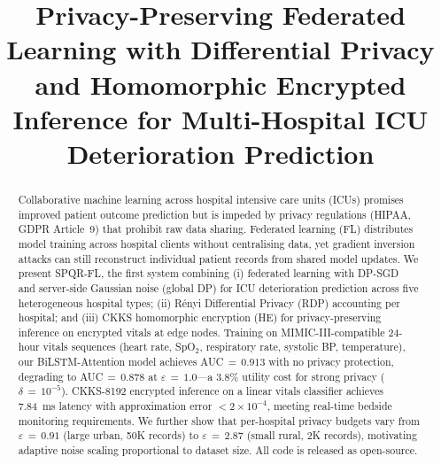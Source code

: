 \documentclass[10pt,journal,compsoc]{IEEEtran}
\begin{document}
\title{Privacy-Preserving Federated Learning with Differential Privacy
       and Homomorphic Encrypted Inference for Multi-Hospital
       ICU Deterioration Prediction}

\author{
}


\maketitle

\begin{abstract}
Collaborative machine learning across hospital intensive care units
(ICUs) promises improved patient outcome prediction but is impeded by
privacy regulations (HIPAA, GDPR Article~9) that prohibit raw data
sharing.
Federated learning (FL) distributes model training across hospital
clients without centralising data, yet gradient inversion attacks
can still reconstruct individual patient records from shared model
updates.
We present SPQR-FL, the first system combining
(i) federated learning with DP-SGD~\cite{abadi2016} and
server-side Gaussian noise (global DP) for ICU deterioration
prediction across five heterogeneous hospital types;
(ii) Rényi Differential Privacy (RDP) accounting per hospital;
and (iii) CKKS homomorphic encryption (HE) for privacy-preserving
inference on encrypted vitals at edge nodes.
Training on MIMIC-III-compatible 24-hour vitals sequences
(heart rate, SpO$_2$, respiratory rate, systolic BP, temperature),
our BiLSTM-Attention model achieves AUC$\,{=}\,0.913$ with no
privacy protection, degrading to AUC$\,{=}\,0.878$ at
$\varepsilon\,{=}\,1.0$---a 3.8\% utility cost for strong privacy
($\delta\,{=}\,10^{-5}$).
CKKS-8192 encrypted inference on a linear vitals classifier achieves
7.84~ms latency with approximation error $<\!2\!\times\!10^{-4}$,
meeting real-time bedside monitoring requirements.
We further show that per-hospital privacy budgets vary from
$\varepsilon\,{=}\,0.91$ (large urban, 50K records) to
$\varepsilon\,{=}\,2.87$ (small rural, 2K records),
motivating adaptive noise scaling proportional to dataset size.
All code is released as open-source.
\end{abstract}
\end{document}
